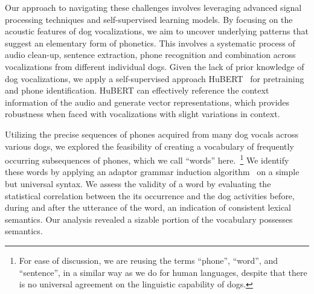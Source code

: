 Our approach to navigating these challenges involves leveraging advanced signal processing 
techniques and self-supervised learning models. By focusing on the acoustic features of 
dog vocalizations, we aim to uncover underlying patterns that suggest an elementary form of 
phonetics. This involves a systematic process of audio clean-up, sentence extraction, 
phone recognition and combination across vocalizations from different individual dogs. 
Given the lack of prior knowledge of dog vocalizations, we apply a self-supervised approach 
HuBERT~\citep{hsu2021hubert} for pretraining and phone identification.
HuBERT can effectively reference the context information of the audio and 
generate vector representations, which provides robustness when faced with vocalizations 
with slight variations in context. 

Utilizing the precise sequences of phones acquired from many dog vocals across various dogs, 
we explored the feasibility of creating a vocabulary of frequently occurring subsequences of
phones, which we call ``words'' here.~\footnote{For ease of discussion, we are reusing
the terms ``phone'', ``word'', and ``sentence'', in a similar way as we do for human languages,
despite that there is no universal agreement on the linguistic capability of dogs.} 
We identify these words by applying 
an adaptor grammar induction algorithm~\cite{zhai2014online} on a simple but universal syntax.
We assess the validity of a word by evaluating the statistical correlation between the its occurrence
and the dog activities before, during and after the utterance of the word, an indication of consistent
lexical semantics.
Our analysis revealed a sizable portion of the vocabulary possesses semantics.




